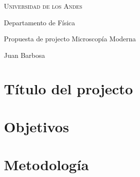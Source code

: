 \documentclass[10pt]{article}
\begin{document}
	{	\centering
		\scshape
		\LARGE
		Universidad de los Andes
		
		\large
		Departamento de F\'isica
		
		\vspace{1cm}
		
		Propuesta de projecto Microscop\'ia Moderna
		
		\normalsize
		Juan Barbosa
		
	}
	
	\section{T\'itulo del projecto}
	\section{Objetivos}
	\section{Metodolog\'ia}
\end{document}
